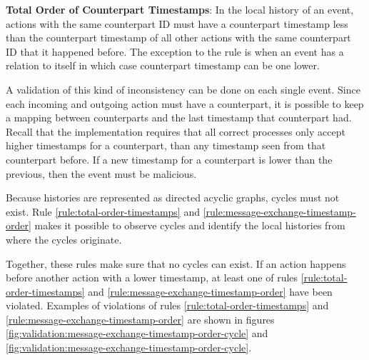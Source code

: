 	\begin{ruledef}
		\textbf{Total Order of Counterpart Timestamps}: In the local history of an event, actions with the same counterpart ID must have a counterpart timestamp less than the counterpart timestamp of all other actions with the same counterpart ID that it happened before. The exception to the rule is when an event has a relation to itself in which case counterpart timestamp can be one lower.
		\label{rule:total-order-counterpart-timestamps}
	\end{ruledef}
	
	\noindent A validation of this kind of inconsistency can be done on each single event. Since each incoming and outgoing action must have a counterpart, it is possible to keep a mapping between counterparts and the last timestamp that counterpart had. Recall that the implementation requires that all correct processes only accept higher timestamps for a counterpart, than any timestamp seen from that counterpart before.  If a new timestamp for a counterpart is lower than the previous, then the event must be malicious.
	
	\newpar Because histories are represented as directed acyclic graphs, cycles must not exist. Rule \ref{rule:total-order-timestamps} and \ref{rule:message-exchange-timestamp-order} makes it possible to observe cycles and identify the local histories from where the cycles originate.
	
	Together, these rules make sure that no cycles can exist. If an action happens before another action with a lower timestamp, at least one of rules \ref{rule:total-order-timestamps} and \ref{rule:message-exchange-timestamp-order} have been violated. Examples of violations of rules \ref{rule:total-order-timestamps} and \ref{rule:message-exchange-timestamp-order} are shown in figures \ref{fig:validation:message-exchange-timestamp-order-cycle} and \ref{fig:validation:message-exchange-timestamp-order-cycle}.
	
